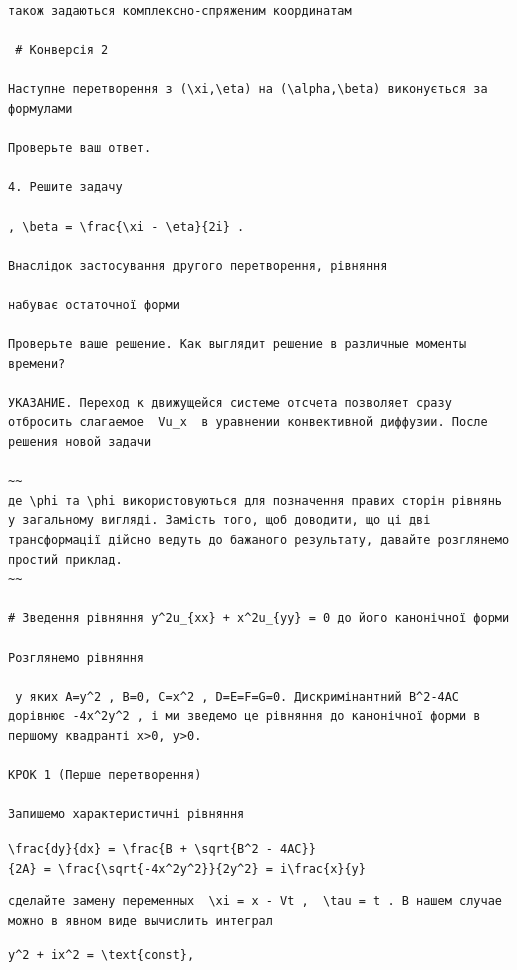 \documentclass[
  ukrainian,
]{article}
\begin{document}
\begin{verbatim}
також задаються комплексно-спряженим координатам

 # Конверсія 2

Наступне перетворення з (\xi,\eta) на (\alpha,\beta) виконується за формулами

Проверьте ваш ответ.

4. Решите задачу

, \beta = \frac{\xi - \eta}{2i} .

Внаслідок застосування другого перетворення, рівняння

набуває остаточної форми

Проверьте ваше решение. Как выглядит решение в различные моменты времени?

УКАЗАНИЕ. Переход к движущейся системе отсчета позволяет сразу отбросить слагаемое  Vu_x  в уравнении конвективной диффузии. После решения новой задачи

~~
де \phi та \phi використовуються для позначення правих сторін рівнянь у загальному вигляді. Замість того, щоб доводити, що ці дві трансформації дійсно ведуть до бажаного результату, давайте розглянемо простий приклад.
~~

# Зведення рівняння y^2u_{xx} + x^2u_{yy} = 0 до його канонічної форми

Розглянемо рівняння

 у яких A=y^2 , B=0, C=x^2 , D=E=F=G=0. Дискримінантний B^2-4AC дорівнює -4x^2y^2 , і ми зведемо це рівняння до канонічної форми в першому квадранті x>0, y>0.

КРОК 1 (Перше перетворення)

Запишемо характеристичні рівняння
\end{verbatim}

\texttt{\textbackslash{}frac\{dy\}\{dx\}\ =\ \textbackslash{}frac\{B\ +\ \textbackslash{}sqrt\{B\^{}2\ -\ 4AC\}\}\{2A\}\ =\ \textbackslash{}frac\{\textbackslash{}sqrt\{-4x\^{}2y\^{}2\}\}\{2y\^{}2\}\ =\ i\textbackslash{}frac\{x\}\{y\}}

\begin{verbatim}
сделайте замену переменных  \xi = x - Vt ,  \tau = t . В нашем случае можно в явном виде вычислить интеграл
\end{verbatim}

\texttt{y\^{}2\ +\ ix\^{}2\ =\ \textbackslash{}text\{const\},}
\end{document}
